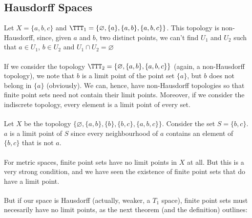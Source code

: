 \documentclass[main.tex]{subfiles}
\begin{document}
\subsection{Hausdorff Spaces}
\begin{example}
    Let $X=\{a,b,c\}$ and $\TTT_1=\{\varnothing, \{a\},\{a,b\}, \{a,b,c\} \}$. This topology is non-Hausdorff, since, given $a$ and $b$, two distinct points, we can't find $U_1$ and $U_2$ such that $a \in U_1$, $b \in U_2$ and $U_1 \cap U_2=\varnothing$
    \\\\ If we consider the topology $\TTT_2=\{\varnothing, \{a,b\},\{a,b,c\}\}$ (again, a non-Hausdorff topology), we note that $b$ is a limit point of the point set $\{a\}$, but $b$ does not belong in $\{a\}$ (obviously). We can, hence, have non-Hausdorff topologies so that finite point sets need not contain their limit points. Moreover, if we consider the indiscrete topology, every element is a limit point of every set.
    \\\\ Let $X$ be the topology $\{\varnothing, \{a,b\}, \{b\}, \{b,c\}, \{a,b,c\}\}$. Consider the set $S=\{b,c\}$. $a$ is a limit point of $S$ since every neighbourhood of $a$ contains an element of $\{b,c\}$ that is not $a$. 
    \\\\ For metric spaces, finite point sets have no limit points in $X$ at all. But this is a very strong condition, and we have seen the existence of finite point sets that do have a limit point. 
    \\\\ But if our space is Hausdorff (actually, weaker, a $T_1$ space), finite point sets must necesarily have no limit points, as the next theorem (and the definition) outlines:
\end{example}
\end{document}
